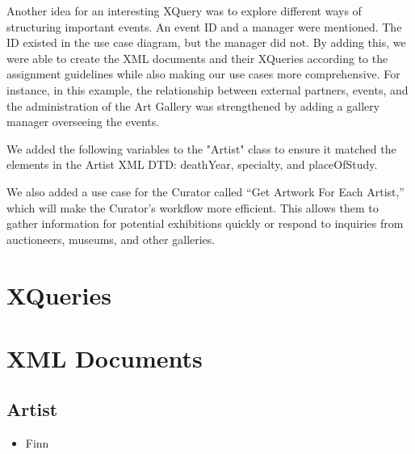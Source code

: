 \documentclass{article} %
\begin{document}
Another idea for an interesting XQuery was to explore different ways of structuring 
important events. An event ID and a manager were mentioned. The ID existed in the use 
case diagram, but the manager did not. By adding this, we were able to create the XML 
documents and their XQueries according to the assignment guidelines while also making 
our use cases more comprehensive. For instance, in this example, the relationship 
between external partners, events, and the administration of the Art Gallery was 
strengthened by adding a gallery manager overseeing the events.

We added the following variables to the "Artist" class to ensure it matched the 
elements in the Artist XML DTD: deathYear, specialty, and placeOfStudy.

We also added a use case for the Curator called “Get Artwork For Each Artist,” which 
will make the Curator's workflow more efficient. This allows them to gather 
information for potential exhibitions quickly or respond to inquiries from auctioneers, 
museums, and other galleries.

\section{XQueries}

\section{XML Documents}

\subsection{Artist}

\begin{itemize}
    \item Finn
\end{itemize}
\end{document}
